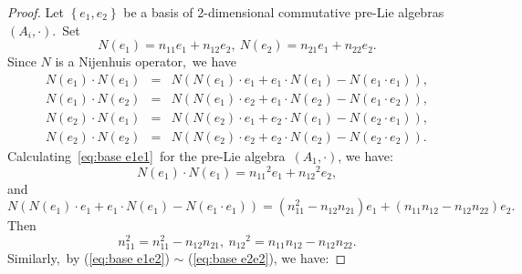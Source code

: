\documentclass[10pt,a4paper]{amsart}
\begin{document}
   \begin{proof}
Let $\left\{e_{1},  e_{2}\right\}$ be a basis of 2-dimensional  commutative pre-Lie algebras~$(A_i,\cdot)$.~Set
  \begin{equation*}\label{eq:An operator on a basis}
    N(e_{1})=n_{11}e_1+n_{12}e_2,~N(e_{2})=n_{21}e_1+n_{22}e_2.
  \end{equation*}
Since $N$ is a Nijenhuis operator,~we have
 \begin{eqnarray}
    N(e_{1}) \cdot N(e_{1})&=&N(N(e_{1}) \cdot  e_{1}+e_{1} \cdot N(e_{1})-N(e_{1} \cdot  e_{1})),\label{eq:base e1e1}\\
     N(e_{1}) \cdot N(e_{2})&=&N(N(e_{1}) \cdot  e_{2}+e_{1} \cdot N(e_{2})-N(e_{1} \cdot  e_{2})),\label{eq:base e1e2}\\
      N(e_{2}) \cdot N(e_{1})&=&N(N(e_{2}) \cdot  e_{1}+e_{2} \cdot N(e_{1})-N(e_{2} \cdot  e_{1})),\label{eq:base e2e1}\\
       N(e_{2}) \cdot N(e_{2})&=&N(N(e_{2}) \cdot  e_{2}+e_{2} \cdot N(e_{2})-N(e_{2} \cdot  e_{2})).\label{eq:base e2e2}
 \end{eqnarray}
Calculating~\eqref{eq:base e1e1}~for the pre-Lie algebra~$(A_{1},\cdot)$, we have:
\begin{equation*}
   N(e_{1}) \cdot N(e_{1})
   = {n_{11}}^2e_1+{n_{12}}^2e_2,\label{eq11}
\end{equation*}
and
\begin{equation*}
  N(N(e_{1}) \cdot  e_{1}+e_{1} \cdot N(e_{1})-N(e_{1} \cdot  e_{1}))
  = (n_{11}^2-n_{12}n_{21})e_1+(n_{11}n_{12}-n_{12}n_{22})e_2.\label{eq12}
\end{equation*}
Then
\begin{equation}\label{A11}
  n_{{11}}^2=n_{11}^2-n_{12}n_{21},~{n_{12}}^2=n_{11}n_{12}-n_{12}n_{22}.
\end{equation}
Similarly,~by (\ref{eq:base e1e2}) $\sim$ (\ref{eq:base e2e2}), we have:

\end{proof}
\end{document}
